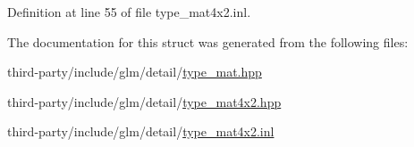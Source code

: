Definition at line 55 of file type\+\_\+mat4x2.\+inl.



The documentation for this struct was generated from the following files\+:\begin{DoxyCompactItemize}
\item 
third-\/party/include/glm/detail/\hyperlink{type__mat_8hpp}{type\+\_\+mat.\+hpp}\item 
third-\/party/include/glm/detail/\hyperlink{type__mat4x2_8hpp}{type\+\_\+mat4x2.\+hpp}\item 
third-\/party/include/glm/detail/\hyperlink{type__mat4x2_8inl}{type\+\_\+mat4x2.\+inl}\end{DoxyCompactItemize}
